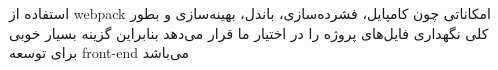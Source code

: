 استفاده از webpack امکاناتی چون کامپایل، فشرده‌سازی، باندل، بهینه‌سازی و بطور کلی نگهداری فایل‌های پروژه را در اختیار ما قرار می‌دهد بنابراین گزینه بسیار خوبی برای توسعه front-end می‌باشد